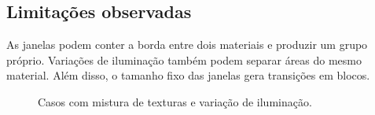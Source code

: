\subsection{Limitações observadas}

As janelas podem conter a borda entre dois materiais e produzir um grupo próprio. Variações de iluminação também podem separar áreas do mesmo material. Além disso, o tamanho fixo das janelas gera transições em blocos.

\begin{figure}[H]
    \centering
    \caption{Casos com mistura de texturas e variação de iluminação.}
    \label{fig:exemplos-negativos}
\end{figure}
